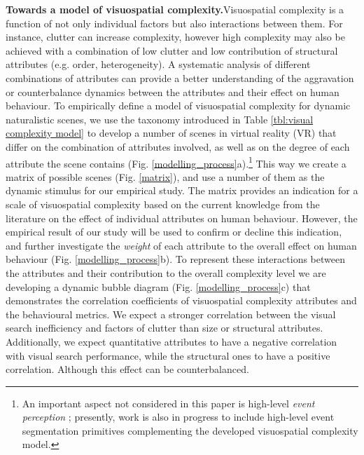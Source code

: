 \documentclass[a4paper]{article}
\begin{document}
\textbf{\sffamily Towards a model of visuospatial complexity.}\quad   Visuospatial complexity is a function of not only individual factors but also interactions between them. For instance, clutter can increase complexity, however high complexity may also be achieved with a combination of low clutter and low contribution of structural attributes (e.g. order, heterogeneity). A systematic analysis of different combinations of attributes can provide a better understanding of the aggravation or counterbalance dynamics between the attributes and their effect on human behaviour. To empirically define a model of visuospatial complexity for dynamic naturalistic scenes, we use the taxonomy introduced in Table \ref{tbl:visual complexity model} to develop a number of scenes in virtual reality (VR) that differ on the combination of attributes involved, as well as on the degree of each attribute the scene contains (Fig. \ref{modelling_process}a).\footnote{An important aspect not considered in this paper is high-level \emph{event perception} \cite{Tversky2013}; presently, work is also in progress to include high-level event segmentation primitives complementing the developed visuospatial complexity model.}
 This way we create a matrix of possible scenes (Fig. \ref{matrix}), and use a number of them as the dynamic stimulus for our empirical study. The matrix provides an indication for a scale of visuospatial complexity based on the current knowledge from the literature on the effect of individual attributes on human behaviour. However, the empirical result of our study will be used to confirm or decline this indication, and further investigate the \emph{weight} of each attribute to the overall effect on human behaviour (Fig. \ref{modelling_process}b). To represent these interactions between the attributes and their contribution to the overall complexity level we are developing a dynamic bubble diagram (Fig. \ref{modelling_process}c) that demonstrates the correlation coefficients of visuospatial complexity attributes and the behavioural metrics. We expect a stronger correlation between the visual search inefficiency and factors of clutter than size or structural attributes. Additionally, we expect quantitative attributes to have a negative correlation with visual search performance, while the structural ones to have a positive correlation. Although this effect can be counterbalanced.
\end{document}
